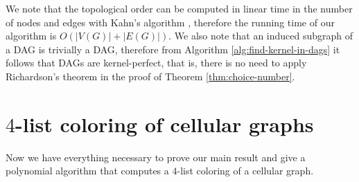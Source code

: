 \documentclass[letterpaper, 10 pt, conference]{ieeeconf}  %
\begin{document}
We note that the topological order can be computed in linear time in the number of nodes and edges with Kahn's algorithm \cite{Kahn:1962:TSL:368996.369025}, therefore the running time of our algorithm is $O(|V(G)|+|E(G)|)$. We also note that an induced subgraph of a DAG is trivially a DAG, therefore from Algorithm \ref{alg:find-kernel-in-dags} it follows that DAGs are kernel-perfect, that is, there is no need to apply Richardson's theorem in the proof of Theorem \ref{thm:choice-number}.
\section{$4$-list coloring of cellular graphs}\label{sec:4-list-coloring}
Now we have everything necessary to prove our main result and give a polynomial algorithm that computes a $4$-list coloring of a cellular graph. 
\end{document}

